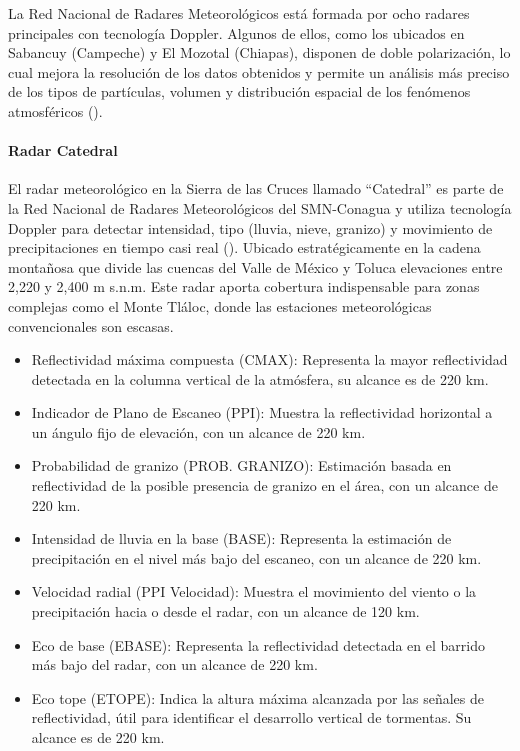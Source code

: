 La Red Nacional de Radares Meteorológicos está formada por ocho radares principales con tecnología Doppler. Algunos de ellos, como los ubicados en Sabancuy (Campeche) y El Mozotal (Chiapas), disponen de doble polarización, lo cual mejora la resolución de los datos obtenidos y permite un análisis más preciso de los tipos de partículas, volumen y distribución espacial de los fenómenos atmosféricos (\cite{smn_radar65_2025}).

\paragraph{Radar Catedral} 

El radar meteorológico en la Sierra de las Cruces llamado ``Catedral'' es parte de la Red Nacional de Radares Meteorológicos del SMN-Conagua y utiliza tecnología Doppler para detectar intensidad, tipo (lluvia, nieve, granizo) y movimiento de precipitaciones en tiempo casi real (\cite{ConaguaRadar2025}). Ubicado estratégicamente en la cadena montañosa que divide las cuencas del Valle de México y Toluca  elevaciones entre 2,220 y 2,400 m s.n.m. Este radar aporta cobertura indispensable para zonas complejas como el Monte Tláloc, donde las estaciones meteorológicas convencionales son escasas.

\begin{itemize}
\item Reflectividad máxima compuesta (CMAX): Representa la mayor reflectividad detectada en la columna vertical de la atmósfera, su alcance es de 220 km.
\item Indicador de Plano de Escaneo (PPI): Muestra la reflectividad horizontal a un ángulo fijo de elevación, con un alcance de 220 km.
\item Probabilidad de granizo (PROB. GRANIZO): Estimación basada en reflectividad de la posible presencia de granizo en el área, con un alcance de 220 km.
\item Intensidad de lluvia en la base (BASE): Representa la estimación de precipitación en el nivel más bajo del escaneo, con un alcance de 220 km.
\item Velocidad radial (PPI Velocidad): Muestra el movimiento del viento o la precipitación hacia o desde el radar, con un alcance de 120 km.
\item Eco de base (EBASE): Representa la reflectividad detectada en el barrido más bajo del radar, con un alcance de 220 km.
\item Eco tope (ETOPE): Indica la altura máxima alcanzada por las señales de reflectividad, útil para identificar el desarrollo vertical de tormentas. Su alcance es de 220 km.
\end{itemize}

